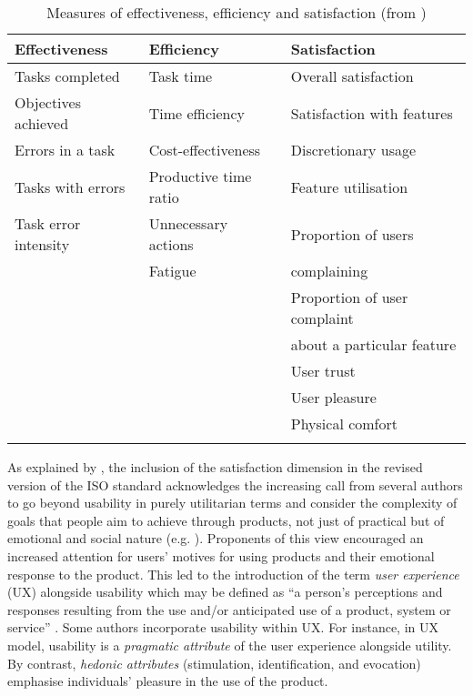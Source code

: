 \begin{table}
\begin{tabular}{lll}
\lsptoprule
Effectiveness & Efficiency & Satisfaction\\\midrule
Tasks completed &  Task time & Overall satisfaction \\
Objectives achieved & Time efficiency & Satisfaction with features \\
Errors in a task & Cost-effectiveness & Discretionary usage \\
Tasks with errors & Productive time ratio & Feature utilisation \\
Task error intensity & Unnecessary actions & Proportion of users \\
 & Fatigue &\hspace*{1em}complaining\\
 &  & Proportion of user complaint\\
 &  & \hspace*{1em}about a particular feature\\
 &  & User trust \\
 &  & User pleasure \\
 &  & Physical comfort
\\ \lspbottomrule
\end{tabular}
\caption{Measures of effectiveness, efficiency and satisfaction (from \cite{bevan2016new})\label{tab:1}}
\end{table}

As explained by \citet{bevan2016new}, the inclusion of the satisfaction dimension in the revised version of the ISO standard acknowledges the increasing call from several authors to go beyond usability in purely utilitarian terms and consider the complexity of goals that people aim to achieve through products, not just of practical but of emotional and social nature (e.g. \cite{burmester2002usability}). Proponents of this view encouraged an increased attention for users’ motives for using products and their emotional response to the product. This led to the introduction of the term \textit{user experience} (UX) alongside usability which may be defined as ``a person’s perceptions and responses resulting from the use and/or anticipated use of a product, system or service'' \citep{iso2010}. Some authors incorporate usability within UX. For instance, in  UX model, usability is a \textit{pragmatic attribute} of the user experience alongside utility. By contrast, \textit{hedonic attributes} (stimulation, identification, and evocation) emphasise individuals’ pleasure in the use of the product.

